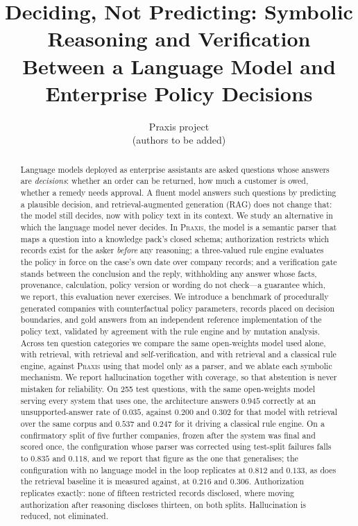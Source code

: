 \documentclass[11pt]{article}
\title{Deciding, Not Predicting: Symbolic Reasoning and Verification Between a Language
Model and Enterprise Policy Decisions}
\author{Praxis project\\\small (authors to be added)}
\date{}
\begin{document}
\maketitle

\begin{abstract}
Language models deployed as enterprise assistants are asked questions whose answers are
\emph{decisions}: whether an order can be returned, how much a customer is owed, whether
a remedy needs approval. A fluent model answers such questions by predicting a plausible
decision, and retrieval-augmented generation (RAG) does not change that: the model still
decides, now with policy text in its context. We study an alternative in which the
language model never decides. In \textsc{Praxis}, the model is a semantic parser that
maps a question into a knowledge pack's closed schema; authorization restricts which
records exist for the asker \emph{before} any reasoning; a three-valued rule engine
evaluates the policy in force on the case's own date over company records; and a
verification gate stands between the conclusion and the reply, withholding any answer
whose facts, provenance, calculation, policy version or wording do not check---a
guarantee which, we report, this evaluation never exercises. We introduce a benchmark of
procedurally generated
companies with counterfactual policy parameters, records placed on decision
boundaries, and gold answers from an independent reference implementation of the policy
text, validated by agreement with the rule engine and by mutation analysis. Across ten
question categories we compare the same open-weights model used alone, with retrieval,
with retrieval and self-verification, and with retrieval and a classical rule engine,
against \textsc{Praxis} using that model only as a parser, and we ablate each symbolic
mechanism. We report hallucination together with coverage, so that abstention is never
mistaken for reliability.
On 255 test questions, with the same open-weights model serving every system that uses
one, the architecture answers $0.945$ correctly at an unsupported-answer rate of $0.035$,
against $0.200$ and $0.302$ for that model with retrieval over the same corpus and $0.537$
and $0.247$ for it driving a classical rule engine. On a confirmatory split of five
further companies, frozen after the system was final and scored once, the configuration
whose parser was corrected using test-split failures falls to $0.835$ and $0.118$, and we
report that figure as the one that generalises; the configuration with no language model
in the loop replicates at $0.812$ and $0.133$, as does the retrieval baseline it is
measured against, at $0.216$ and $0.306$. Authorization replicates exactly: none of
fifteen restricted records disclosed, where moving authorization after reasoning discloses
thirteen, on both splits. Hallucination is reduced, not eliminated.
\end{abstract}
\end{document}
